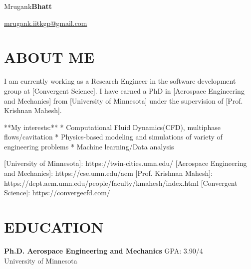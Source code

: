 \documentclass{res}
\begin{document}
	\hspace*{-0.05\textwidth}
	\begin{minipage}[t]{0.6\textwidth}
	\begin{flushleft}
	\vspace*{\fill}
	{\fontsize{45}{45}\selectfont Mrugank\textbf{Bhatt}}
	\end{flushleft}
	\end{minipage}
	\begin{minipage}[t]{0.44\textwidth}
	\begin{flushright}
	\href{mailto:mrugank.iitkgp@gmail.com}{mrugank.iitkgp@gmail.com} \\ 
	\end{flushright}
	\end{minipage}

	\begin{resume}
	
	
	\section{\MakeUppercase{About me}} \vskip 0.15in
	I am currently working as a Research Engineer in the software development group at [Convergent Science]. I have earned a PhD in [Aerospace Engineering and Mechanics] from [University of Minnesota] under the supervision of [Prof. Krishnan Mahesh].

**My interests:**
* Computational Fluid Dynamics(CFD), multiphase flows/cavitation
* Physics-based modeling and simulations of variety of engineering problems
* Machine learning/Data analysis


[University of Minnesota]: https://twin-cities.umn.edu/
[Aerospace Engineering and Mechanics]: https://cse.umn.edu/aem
[Prof. Krishnan Mahesh]: https://dept.aem.umn.edu/people/faculty/kmahesh/index.html
[Convergent Science]: https://convergecfd.com/

	
	
	
	\section{\MakeUppercase{Education}} \vskip 0.15in
	
	{\bf Ph.D. Aerospace Engineering and Mechanics} \hfill GPA: 3.90/4 \\
	{University of Minnesota \hfill } 
	

\end{resume}
\end{document}
